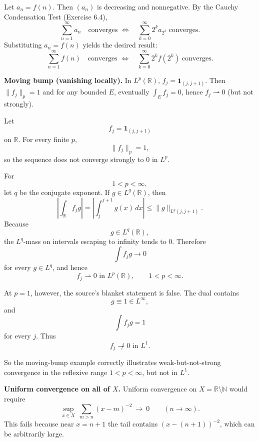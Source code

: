 \begin{solution}
Let $a_n=f(n)$. Then $(a_n)$ is decreasing and nonnegative. By the Cauchy
	Condensation Test (Exercise 6.4),
	\[
	\sum_{n=1}^\infty a_n \quad \text{converges } \iff \quad \sum_{k=0}^\infty 2^k a_{2^k} \;\text{converges}.
	\]
	Substituting $a_n=f(n)$ yields the desired result:
	\[
	\sum_{n=1}^\infty f(n) \quad \text{converges } \iff \quad \sum_{k=0}^\infty 2^k f(2^k) \;\text{converges}.
	\]
\end{solution}

\begin{problem}[CP-II-0081]
\label{prob:cp-ii-0081}
\textbf{Moving bump (vanishing locally).}
		In $L^{p}(\mathbb R)$, $f_j=\mathbf 1_{(j,j+1)}$. Then $\|f_j\|_{p}=1$ and for any bounded $E$,
		eventually $\int_E f_j=0$, hence $f_j\rightharpoonup 0$ (but not strongly).
\end{problem}

\begin{solution}
Let
\[
f_j=\mathbf1_{(j,j+1)}
\]
on \(\mathbb R\). For every finite \(p\),
\[
\|f_j\|_p=1,
\]
so the sequence does not converge strongly to \(0\) in \(L^p\).

For
\[
1<p<\infty,
\]
let \(q\) be the conjugate exponent. If \(g\in L^q(\mathbb R)\), then
\[
\left|
\int_{\mathbb R}f_jg
\right|
=
\left|
\int_j^{j+1}g(x)\,dx
\right|
\le
\|g\|_{L^q(j,j+1)}.
\]
Because
\[
g\in L^q(\mathbb R),
\]
the \(L^q\)-mass on intervals escaping to infinity tends to \(0\). Therefore
\[
\int f_jg\to0
\]
for every \(g\in L^q\), and hence
\[
\boxed{
f_j\rightharpoonup0
\text{ in }L^p(\mathbb R),
\qquad
1<p<\infty.
}
\]

At \(p=1\), however, the source's blanket statement is false. The dual contains
\[
g\equiv1\in L^\infty,
\]
and
\[
\int f_jg=1
\]
for every \(j\). Thus
\[
\boxed{
f_j\not\rightharpoonup0
\text{ in }L^1.
}
\]

So the moving-bump example correctly illustrates weak-but-not-strong convergence in the
reflexive range \(1<p<\infty\), but not in \(L^1\).
\end{solution}


\begin{problem}[CP-II-0084]
\label{prob:cp-ii-0084}
\textbf{Uniform convergence on all of $X$.}
	Uniform convergence on $X=\mathbb{R}\setminus\mathbb{N}$ would require
	\[
	\sup_{x\in X}\ \sum_{m>n} (x-m)^{-2}\ \longrightarrow\ 0\qquad (n\to\infty).
	\]
	This fails because near $x=n+1$ the tail contains $(x-(n+1))^{-2}$, which can be arbitrarily large.
\end{problem}


